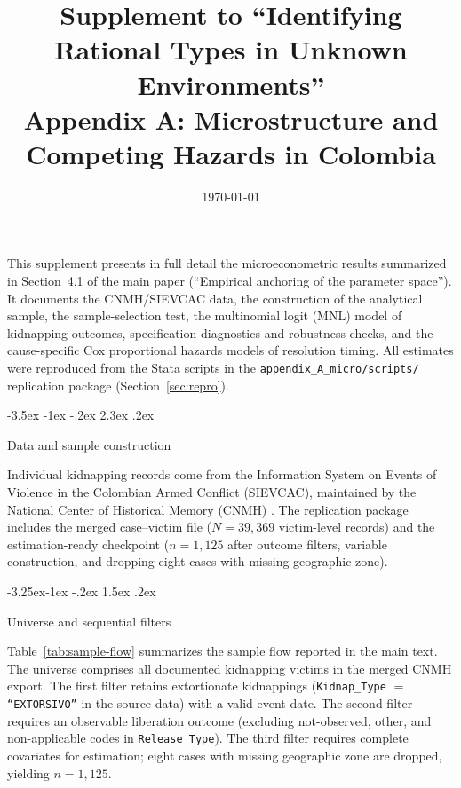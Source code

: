 \documentclass[12pt]{article}
\makeatletter
\numberwithin{equation}{section}
\numberwithin{table}{section}
\renewcommand\section{\@startsection {section}{1}{\z@}%
                                   {-3.5ex \@plus -1ex \@minus -.2ex}%
                                   {2.3ex \@plus.2ex}%
                                   {\normalfont\Large\bfseries\raggedright}}
\renewcommand\subsection{\@startsection{subsection}{2}{\z@}%
                                     {-3.25ex\@plus -1ex \@minus -.2ex}%
                                     {1.5ex \@plus .2ex}%
                                     {\normalfont\large\bfseries\raggedright}}
\makeatother
\begin{document}
\title{Supplement to ``Identifying Rational Types in Unknown Environments''\\
Appendix A: Microstructure and Competing Hazards in Colombia}
\author{}
\date{\today}
\maketitle

\noindent
This supplement presents in full detail the microeconometric results
summarized in Section~4.1 of the main paper (``Empirical anchoring of the
parameter space''). It documents the CNMH/SIEVCAC data, the construction
of the analytical sample, the sample-selection test, the multinomial logit
(MNL) model of kidnapping outcomes, specification diagnostics and robustness
checks, and the cause-specific Cox proportional hazards models of resolution
timing. All estimates were reproduced from the Stata scripts in the
\texttt{appendix\_A\_micro/scripts/} replication package (Section~\ref{sec:repro}).

\section{Data and sample construction}
\label{sec:data}

Individual kidnapping records come from the Information System on Events of
Violence in the Colombian Armed Conflict (SIEVCAC), maintained by the
National Center of Historical Memory (CNMH) \citep{cnmh_datos,CNMH2013}.
The replication package includes the merged case--victim file
 ($N=39{,}369$ victim-level records) and the
estimation-ready checkpoint  ($n=1{,}125$
after outcome filters, variable construction, and dropping eight cases with
missing geographic zone).

\subsection{Universe and sequential filters}

Table~\ref{tab:sample-flow} summarizes the sample flow reported in the main
text. The universe comprises all documented kidnapping victims in the merged
CNMH export. The first filter retains extortionate kidnappings
(\texttt{Kidnap\_Type} $=$ \texttt{``EXTORSIVO''} in the source data) with a valid event date. The second
filter requires an observable liberation outcome (excluding not-observed,
other, and non-applicable codes in \texttt{Release\_Type}). The third
filter requires complete covariates for estimation; eight cases with missing
geographic zone are dropped, yielding $n=1{,}125$.
\end{document}

